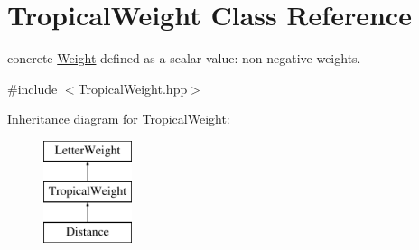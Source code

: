 \hypertarget{classTropicalWeight}{}\section{Tropical\+Weight Class Reference}
\label{classTropicalWeight}


concrete \mbox{\hyperlink{classWeight}{Weight}} defined as a scalar value\+: non-\/negative weights.  




{\ttfamily \#include $<$Tropical\+Weight.\+hpp$>$}

Inheritance diagram for Tropical\+Weight\+:\begin{figure}[H]
\begin{center}
\leavevmode
\includegraphics[height=3.000000cm]{classTropicalWeight}
\end{center}
\end{figure}
